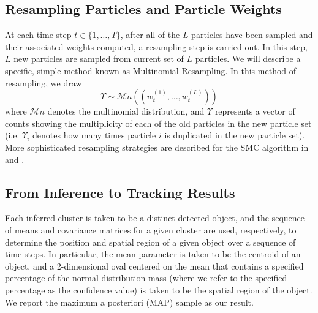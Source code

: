 \documentclass[twocolumn, final]{svjour3}
\begin{document}


\subsection{Resampling Particles and Particle Weights}
\label{sec:resample}

At each time step $t \in \{ 1, \ldots, T \}$, after all of the $L$ particles have been sampled and their associated weights computed, a resampling step is carried out. In this step, $L$ new particles are sampled from current set of $L$ particles. We will describe a specific, simple method known as Multinomial Resampling. In this method of resampling, we draw
\begin{equation}
\Upsilon \sim \mathcal{M}n((w_{t}^{(1)}, \ldots, w_{t}^{(L)}))
\end{equation}
where $\mathcal{M}n$ denotes the multinomial distribution, and $\Upsilon$ represents a vector of counts showing the multiplicity of each of the old particles in the new particle set (i.e. $\Upsilon_{i}$ denotes how many times particle $i$ is duplicated in the new particle set). More sophisticated resampling strategies are described for the SMC algorithm in \cite{gasthaus_thesis} and \cite{douc2005comparison}.


\subsection{From Inference to Tracking Results}
\label{sec:inferencetotrackingresults}

Each inferred cluster is taken to be a distinct detected object, and the sequence of means and covariance matrices for a given cluster are used, respectively, to determine the position and spatial region of a given object over a sequence of time steps. In particular, the mean parameter is taken to be the centroid of an object, and a 2-dimensional oval centered on the mean that contains a specified percentage of the normal distribution mass (where we refer to the specified percentage as the confidence value) is taken to be the spatial region of the object. We report the maximum a posteriori (MAP) sample as our result.
\end{document}
